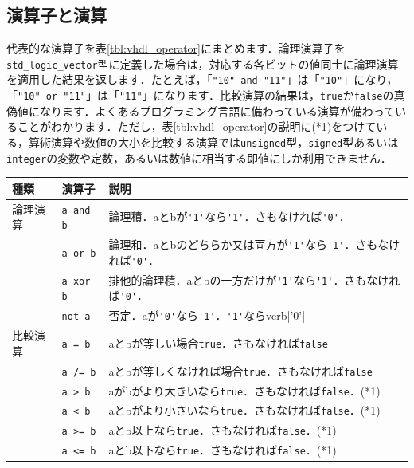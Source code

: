 \documentclass[a4paper,dvipdfmx]{jsarticle}
\begin{document}
\subsection{演算子と演算}
代表的な演算子を表\ref{tbl:vhdl_operator}にまとめます．論理演算子を\verb|std_logic_vector|型に定義した場合は，対応する各ビットの値同士に論理演算を適用した結果を返します．たとえば，「\verb|"10" and "11"|」は「\verb|"10"|」になり，「\verb|"10" or "11"|」は「\verb|"11"|」になります．比較演算の結果は，\verb|true|か\verb|false|の真偽値になります．よくあるプログラミング言語に備わっている演算が備わっていることがわかります．ただし，表\ref{tbl:vhdl_operator}の説明に(*1)をつけている，算術演算や数値の大小を比較する演算では\verb|unsigned|型，\verb|signed|型あるいは\verb|integer|の変数や定数，あるいは数値に相当する即値にしか利用できません．

\begin{table}[H]
\begin{center}
 \begin{tabular}{l|l|l}
 \hline
  種類      & 演算子         & 説明 \\\hline\hline
  論理演算  & \verb|a and b| & 論理積．aとbが\verb|'1'|なら\verb|'1'|．さもなければ\verb|'0'|．\\\cline{2-3}
            & \verb|a or b|  & 論理和．aとbのどちらか又は両方が\verb|'1'|なら\verb|'1'|．さもなければ\verb|'0'|．\\\cline{2-3}
            & \verb|a xor b| & 排他的論理積．aとbの一方だけが\verb|'1'|なら\verb|'1'|．さもなければ\verb|'0'|．\\\cline{2-3}
            & \verb|not a|   & 否定．aが\verb|'0'|なら\verb|'1'|．\verb|'1'|ならverb|'0'|\\\hline
  比較演算  & \verb|a = b|   & aとbが等しい場合\verb|true|．さもなければ\verb|false|\\\cline{2-3}
            & \verb|a /= b|  & aとbが等しくなければ場合\verb|true|．さもなければ\verb|false|\\\cline{2-3}
            & \verb|a > b|   & aがbがより大きいなら\verb|true|．さもなければ\verb|false|．(*1)\\\cline{2-3}
            & \verb|a < b|   & aとbがより小さいなら\verb|true|．さもなければ\verb|false|．(*1)\\\cline{2-3}
            & \verb|a >= b|  & aとb以上なら\verb|true|．さもなければ\verb|false|．(*1)\\\cline{2-3}
            & \verb|a <= b|  & aとb以下なら\verb|true|．さもなければ\verb|false|．(*1)\\\hline

\end{tabular}
\end{center}
\end{table}
\end{document}
